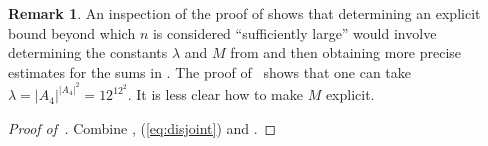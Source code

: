 \documentclass{amsart}
\numberwithin{equation}{section} \numberwithin{figure}{section}
\theoremstyle{one}
\theoremstyle{definition}
\newtheorem{remark}[theorem]{Remark}
\begin{document}
\begin{remark}\label{rem:suff large}
An inspection of the proof of  shows that determining an explicit bound beyond which $n$ is considered ``sufficiently large'' would involve determining the constants $\lambda$ and $M$ from  and then obtaining more precise estimates for the sums in . The proof of~\cite[Lemma~3.3]{ell.ven:05} shows that one can take $\lambda=|A_4|^{|A_4|^2}=12^{12^2}$. It is less clear how to make $M$ explicit.
\end{remark}

           

\begin{proof}[Proof of~]
  Combine , (\ref{eq:disjoint}) and . 
\end{proof}








\end{document}
